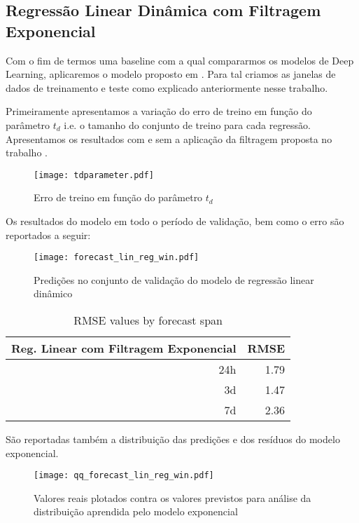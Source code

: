 \subsection{Regressão Linear Dinâmica com Filtragem Exponencial}

Com o fim de termos uma baseline com a qual compararmos os modelos de Deep
Learning, aplicaremos o modelo proposto em \citep{grecialin}.
Para tal criamos as janelas de dados de treinamento e teste
como explicado anteriormente nesse trabalho. 

Primeiramente apresentamos a variação do erro de treino em
função do parâmetro $t_d$ i.e. o tamanho do conjunto de treino para cada
regressão. Apresentamos os resultados com e sem a aplicação da filtragem
proposta no trabalho \citep{grecialin}.

\begin{figure}[H]
  \centering
  \texttt{[image: tdparameter.pdf]}
  \caption{Erro de treino em função do parâmetro $t_d$}
  \label{fig:tdparam}
\end{figure}

Os resultados do modelo em todo o período de validação, bem como o erro são
reportados a seguir:

\begin{figure}[H]
  \centering
  \texttt{[image: forecast\_lin\_reg\_win.pdf]}
  \caption{Predições no conjunto de validação do modelo de regressão linear dinâmico}
  \label{fig:tdparam}
\end{figure}

\begin{center}
  \begin{table}[htbp]
    \caption{RMSE values by forecast span}
    \centering
    \begin{tabular}{rr}
      \hline
      Reg. Linear com Filtragem Exponencial & RMSE\\
      \hline
      24h & 1.79 \\ 
      3d & 1.47\\
      7d & 2.36\\
    \end{tabular}

    \label{tb:rmse_exp}
  \end{table}
\end{center}
São reportadas também a distribuição das predições e dos resíduos do modelo exponencial.

\begin{figure}[H]
  \label{fig:distr_exp}
  \centering
  \texttt{[image: qq\_forecast\_lin\_reg\_win.pdf]} \hfill
  \caption{Valores reais plotados contra os valores previstos para análise da
    distribuição aprendida pelo modelo exponencial} 
\end{figure}


